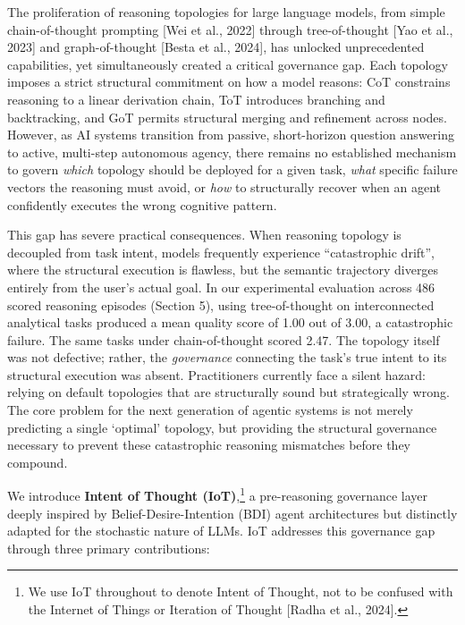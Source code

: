 \documentclass[11pt,a4paper]{article}
\begin{document}
The proliferation of reasoning topologies for large language
models, from simple chain-of-thought prompting {[}Wei et al., 2022{]}
through tree-of-thought {[}Yao et al., 2023{]} and graph-of-thought
{[}Besta et al., 2024{]}, has unlocked unprecedented capabilities, yet
simultaneously created a critical governance gap. Each topology imposes
a strict structural commitment on how a model reasons: CoT constrains
reasoning to a linear derivation chain, ToT introduces branching and
backtracking, and GoT permits structural merging and refinement across
nodes. However, as AI systems transition from passive, short-horizon
question answering to active, multi-step autonomous agency, there
remains no established mechanism to govern \emph{which} topology should
be deployed for a given task, \emph{what} specific failure vectors the
reasoning must avoid, or \emph{how} to structurally recover when an
agent confidently executes the wrong cognitive pattern.

This gap has severe practical consequences. When reasoning topology is
decoupled from task intent, models frequently experience ``catastrophic
drift'', where the structural execution is flawless, but the semantic
trajectory diverges entirely from the user's actual goal. In our
experimental evaluation across 486 scored reasoning episodes (Section
5), using tree-of-thought on interconnected analytical tasks produced a
mean quality score of 1.00 out of 3.00, a catastrophic failure. The
same tasks under chain-of-thought scored 2.47. The topology itself was
not defective; rather, the \emph{governance} connecting the task's true
intent to its structural execution was absent. Practitioners currently
face a silent hazard: relying on default topologies that are
structurally sound but strategically wrong. The core problem for the
next generation of agentic systems is not merely predicting a single
`optimal' topology, but providing the structural governance necessary to
prevent these catastrophic reasoning mismatches before they compound.

We introduce \textbf{Intent of Thought (IoT)},\footnote{We use IoT
  throughout to denote Intent of Thought, not to be confused with the
  Internet of Things or Iteration of Thought {[}Radha et al., 2024{]}.}
a pre-reasoning governance layer deeply inspired by
Belief-Desire-Intention (BDI) agent architectures but distinctly adapted
for the stochastic nature of LLMs. IoT addresses this governance gap
through three primary contributions:
\end{document}
